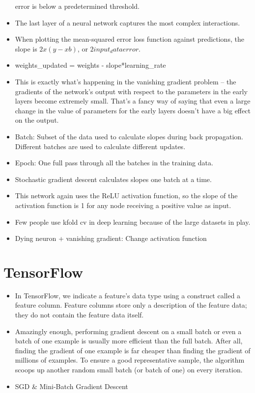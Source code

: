 \documentclass[]{book}
\theoremstyle{definition}
\theoremstyle{definition}
\theoremstyle{definition}
\theoremstyle{remark}
\begin{document}
\begin{itemize}
  error is below a predetermined threshold.
\item
  The last layer of a neural network captures the most complex
  interactions.
\item
  When plotting the mean-squared error loss function against
  predictions, the slope is \(2x(y-xb)\), or \(2input_data error\).
\item
  weights\_updated = weights - slope*learning\_rate
\item
  This is exactly what's happening in the vanishing gradient problem --
  the gradients of the network's output with respect to the parameters
  in the early layers become extremely small. That's a fancy way of
  saying that even a large change in the value of parameters for the
  early layers doesn't have a big effect on the output.
\item
  Batch: Subset of the data used to calculate slopes during back
  propagation. Different batches are used to calculate different
  updates.
\item
  Epoch: One full pass through all the batches in the training data.
\item
  Stochastic gradient descent calculates slopes one batch at a time.
\item
  This network again uses the ReLU activation function, so the slope of
  the activation function is 1 for any node receiving a positive value
  as input.
\item
  Few people use kfold cv in deep learning because of the large datasets
  in play.
\item
  Dying neuron + vanishing gradient: Change activation function
\end{itemize}

\section{TensorFlow}\label{tensorflow}

\begin{itemize}
\item
  In TensorFlow, we indicate a feature's data type using a construct
  called a feature column. Feature columns store only a description of
  the feature data; they do not contain the feature data itself.
\item
  Amazingly enough, performing gradient descent on a small batch or even
  a batch of one example is usually more efficient than the full batch.
  After all, finding the gradient of one example is far cheaper than
  finding the gradient of millions of examples. To ensure a good
  representative sample, the algorithm scoops up another random small
  batch (or batch of one) on every iteration.
\item
  SGD \& Mini-Batch Gradient Descent
\end{itemize}
\end{document}
